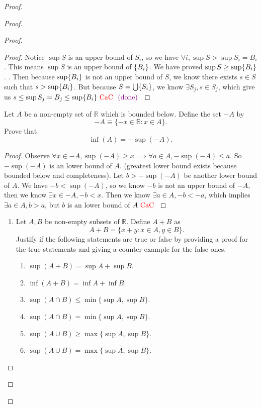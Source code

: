 \documentclass{report}
\begin{document}
\begin{proof}
\begin{proof}
\begin{proof}
\begin{proof}
  Notice $\sup S$ is an upper bound of $S_i$, so we have $\forall i, \sup S>\sup S_i=B_i$. This means $\sup S$ is an upper bound of $\{ B_i \}$. We have proved $\sup S\geq \sup \{ B_i \}$. . Then because $\sup \{ B_i \}$ is not an upper bound of $S$, we know there exists  $s \in S$ such that $s>\sup \{ B_i \}$. But because $S=\bigcup \{ S_i \}$, we know $\exists S_j,s \in S_j$, which give us $s\leq \sup S_j=B_j\leq \sup \{ B_i \}\text{ \textcolor{red}{CaC} }\textcolor{violet}{\text{ (done) }}$
\end{proof}
\begin{question}{}{}
Let \( A \) be a non-empty set of \( \mathbb{R} \) which is bounded below. Define the set \( -A \) by 
\[ -A \equiv \{-x \in \mathbb{R} : x \in A\}. \]
Prove that
\[ \inf(A) = -\sup(-A). \]
\end{question}
\begin{proof}
Observe $\forall x\in -A, \sup (-A)\geq  x\implies \forall a \in A, -\sup (-A)\leq  a$. So $-\sup (-A)$ is an lower bound of $A$.  (greatest lower bound exists because bounded below and completeness). Let $b>-\sup (-A)$ be another lower bound of $A$. We have $-b<\sup (-A)$, so we know $-b$ is not an upper bound of $-A$, then we know  $\exists x \in -A, -b<x$. Then we know $\exists a \in A, -b<-a$, which implies $\exists a \in A, b>a$, but $b$ is an lower bound of $A\text{ \textcolor{red}{CaC} }$
\end{proof}
\begin{question}{}{}
\begin{enumerate}
    \item Let \( A, B \) be non-empty subsets of \( \mathbb{R} \). Define \( A+B \) as 
    \[ A+B = \{ x+y : x \in A, y \in B \}. \]
    Justify if the following statements are true or false by providing a proof for the true statements and giving a counter-example for the false ones.
    \begin{enumerate}
        \item \( \sup(A+B) = \sup A + \sup B \).
        \item \( \inf(A+B) = \inf A + \inf B \).
        \item \( \sup(A \cap B) \leq \min\{\sup A, \sup B\} \).
        \item \( \sup(A \cap B) = \min\{\sup A, \sup B\} \).
        \item \( \sup(A \cup B) \geq \max\{\sup A, \sup B\} \).
        \item \( \sup(A \cup B) = \max\{\sup A, \sup B\} \).
    \end{enumerate}

\end{enumerate}
\end{question}
\end{proof}
\end{proof}
\end{proof}
\end{document}
